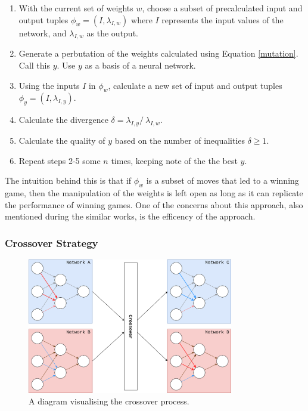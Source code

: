 \documentclass[12pt,a4paper]{article}
\begin{document}
             \begin{enumerate}
             \item With the current set of weights $w$, choose a subset of precalculated input and output tuples $\phi_{w} = (I, \lambda_{I,w})$ where $I$ represents the input values of the network, and $\lambda_{I,w}$ as the output.
             \item Generate a perbutation of the weights calculated using Equation \ref{mutation}. Call this $y$. Use $y$ as a basis of a neural network. 
              \item Using the inputs $I$ in $\phi_{w}$, calculate a new set of input and output tuples $\phi_{y} = (I, \lambda_{I,y})$.
              \item Calculate the divergence $\delta = \lambda_{I,y} /\ \lambda_{I,w}.$ 
              \item Calculate the quality of $y$ based on the number of inequalities $\delta \geq 1$.
             \item Repeat steps 2-5 some $n$ times, keeping note of the the best $y$. 
             \end{enumerate}

            The intuition behind this is that if $\phi_{w}$ is a subset of moves that led to a winning game, then the manipulation of the weights is left open as long as it can replicate the performance of winning games. One of the concerns about this approach, also mentioned during the similar works, is the efficency of the approach. %
            
        \subsubsection{Crossover Strategy} \label{crossover_strategy}

                
           \begin{figure}
                \centering
                \includegraphics[width=90mm]{images/crossover.png}
                \caption{A diagram visualising the crossover process.\label{crossoverpic}}
            \end{figure}
\end{document}
